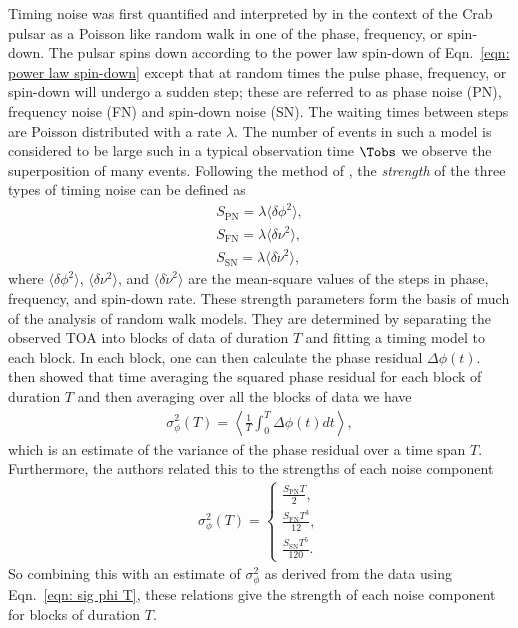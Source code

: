 Timing noise was first quantified and interpreted by \citet{Boynton1972} in the
context of the Crab pulsar as a Poisson like random walk in one of the phase,
frequency, or spin-down. The pulsar spins down according to the power law
spin-down of Eqn.~\eqref{eqn: power law spin-down} except that at random times
the pulse phase, frequency, or spin-down will undergo a sudden step; these are
referred to as phase noise (PN), frequency noise (FN) and spin-down noise (SN).
The waiting times between steps are Poisson distributed with a rate $\lambda$.
The number of events in such a model is considered to be
large such in a typical observation time $\Tobs$ we observe the superposition
of many events. Following the method of \citet{Cordes1980}, the \emph{strength}
of the three types of timing noise can be defined as
\begin{align}
S_{\textrm{PN}} = \lambda \langle \delta \phi^{2}\rangle, \label{eqn: SPN} \\
S_{\textrm{FN}} = \lambda \langle \delta \nu^{2}\rangle, \label{eqn: SFN} \\
S_{\textrm{SN}} = \lambda \langle \delta \dot{\nu}^{2}\rangle, \label{eqn: SSN}
\end{align}
where $\langle \delta \phi^{2} \rangle$, $\langle \delta \nu^{2} \rangle$, and
$\langle \delta \dot{\nu}^{2} \rangle$ are the mean-square values of the steps
in phase, frequency, and spin-down rate. These strength parameters form the
basis of much of the analysis of random walk models. They are determined by
separating the observed TOA into blocks of data of duration $T$ and fitting a
timing model to each block.  In each block, one can then calculate the phase
residual $\Delta\phi(t)$. \citet{Cordes1980} then showed that time averaging
the squared phase residual for each block of duration $T$ and then averaging
over all the blocks of data we have
\begin{align}
\sigma^{2}_\phi(T) = \left\langle\frac{1}{T}\int_{0}^{T}\Delta\phi(t) dt \right\rangle,
\label{eqn: sig phi T}
\end{align}
which is an estimate of the variance of the phase residual over a time span $T$.
Furthermore, the authors related this to the strengths of each noise component
\begin{align}
\sigma^{2}_{\phi}(T) = \left\{
\begin{array}{cc}
\frac{S_{\textrm{PN}} T}{2}, \\
\frac{S_{\textrm{FN}} T^{3}}{12},  \\
\frac{S_{\textrm{SN}} T^{5}}{120}.
\end{array}
\right.
\end{align}
So combining this with an estimate of $\sigma^{2}_\phi$ as derived from the
data using Eqn.~\eqref{eqn: sig phi T}, these relations give the strength of
each noise component for blocks of duration $T$.

